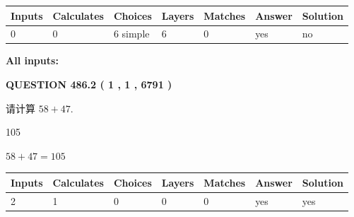 \documentclass{ctexart}
\begin{document}
   
\noindent\begin{tabular}{|l|l|l|l|l|l|l|}
 \hline
Inputs & Calculates & Choices & Layers & Matches & Answer & Solution \\ \hline
 0  & 
 0  & 
 6
  simple  
  & 
 6  & 
 0  & 
  yes & 
  no 
  \\ \hline
 \end{tabular}
   
   
   
   
\noindent{}
   
   
   
   
\noindent\vspace{0.1in}\hspace{-0.08in} {\textbf{\Large{All inputs: }}}
   
   
  
\vspace{0.2in}
  
{\textbf{\Large{QUESTION
486.2 
 ( 1 , 1 , 6791 )
}}}
  
  
 
请计算 $ %
58 +  %
47 $.
 
 
 
\noindent{}
 
 

105
 
 
\noindent{}
 
 

 
 
 
\noindent{}
 
 

$ %
58 +  %
47=   %
105$
 
 
\noindent{}
 
 

 
   
   
   
   
\noindent\begin{tabular}{|l|l|l|l|l|l|l|}
 \hline
Inputs & Calculates & Choices & Layers & Matches & Answer & Solution \\ \hline
 2  & 
 1  & 
 0
  & 
 0  & 
 0  & 
  yes & 
  yes 
  \\ \hline
 \end{tabular}
   
\end{document}
